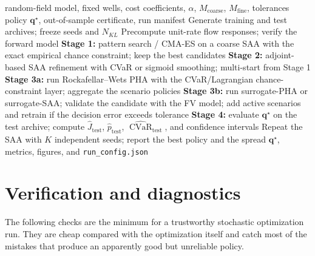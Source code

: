 \documentclass[11pt]{article}
\numberwithin{equation}{section}
\newcommand{\qq}{\mathbf{q}}
\newcommand{\CVaR}{\operatorname{CVaR}}
\theoremstyle{plain}
\begin{document}
\begin{algorithm}[htbp]
\caption{Hybrid algorithm with an optional PHA stage}
\label{alg:hybrid}
\begin{algorithmic}[1]
\Require random-field model, fixed wells, cost coefficients, $\alpha$,
         $M_{\mathrm{coarse}}$, $M_{\mathrm{fine}}$, tolerances
\Ensure policy $\qq^\star$, out-of-sample certificate, run manifest
\State Generate training and test archives; freeze seeds and $N_{KL}$
\State Precompute unit-rate flow responses; verify the forward model
\State \textbf{Stage 1:} pattern search / CMA-ES on a coarse SAA with the
       exact empirical chance constraint; keep the best candidates
\State \textbf{Stage 2:} adjoint-based SAA refinement with CVaR or sigmoid
       smoothing; multi-start from Stage 1
  \State \textbf{Stage 3a:} run Rockafellar--Wets PHA with the
         CVaR/Lagrangian chance-constraint layer; aggregate the scenario
         policies
\EndIf
{}
  \State \textbf{Stage 3b:} run surrogate-PHA or surrogate-SAA; validate the
         candidate with the FV model; add active scenarios and retrain if the
         decision error exceeds tolerance
\EndIf
\State \textbf{Stage 4:} evaluate $\qq^\star$ on the test archive; compute
       $\hat J_{\mathrm{test}}$, $\hat p_{\mathrm{test}}$,
       $\widehat{\CVaR}_{\mathrm{test}}$, and confidence intervals
\State Repeat the SAA with $K$ independent seeds; report the best policy and
       the spread
\State \Return $\qq^\star$, metrics, figures, and \texttt{run\_config.json}
\end{algorithmic}
\end{algorithm}

\section{Verification and diagnostics}
\label{sec:verification}

The following checks are the minimum for a trustworthy stochastic optimization
run.  They are cheap compared with the optimization itself and catch most of
the mistakes that produce an apparently good but unreliable policy.
\end{document}
